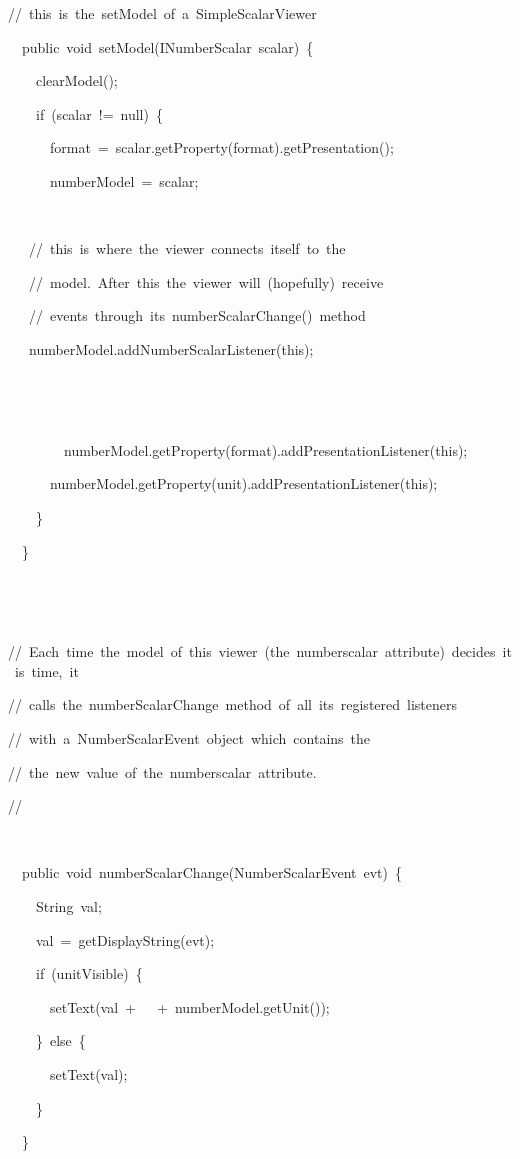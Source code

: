 
\begin{lyxcode}
//~this~is~the~setModel~of~a~SimpleScalarViewer

~~public~void~setModel(INumberScalar~scalar)~\{

~~~~clearModel();

~~~~if~(scalar~!=~null)~\{

~~~~~~format~=~scalar.getProperty(\textquotedbl{}format\textquotedbl{}).getPresentation();

~~~~~~numberModel~=~scalar;

~

~~~//~this~is~where~the~viewer~connects~itself~to~the~

~~~//~model.~After~this~the~viewer~will~(hopefully)~receive~

~~~//~events~through~its~numberScalarChange()~method

~~~numberModel.addNumberScalarListener(this);

~

~~~~~~

~~~~~~~~numberModel.getProperty(\textquotedbl{}format\textquotedbl{}).addPresentationListener(this);

~~~~~~numberModel.getProperty(\textquotedbl{}unit\textquotedbl{}).addPresentationListener(this);

~~~~\}

~~\}

~

~

//~Each~time~the~model~of~this~viewer~(the~numberscalar~attribute)~decides~it~is~time,~it~

//~calls~the~numberScalarChange~method~of~all~its~registered~listeners

//~with~a~NumberScalarEvent~object~which~contains~the~

//~the~new~value~of~the~numberscalar~attribute.

//

~

~~public~void~numberScalarChange(NumberScalarEvent~evt)~\{

~~~~String~val;

~~~~val~=~getDisplayString(evt);

~~~~if~(unitVisible)~\{

~~~~~~setText(val~+~\textquotedbl{}~\textquotedbl{}~+~numberModel.getUnit());

~~~~\}~else~\{

~~~~~~setText(val);

~~~~\}

~~\}

\end{lyxcode}



